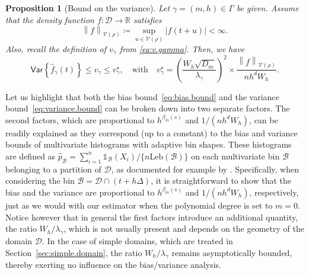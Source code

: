 \documentclass[bj,authoryear]{imsart}
\numberwithin{equation}{section}
\theoremstyle{plain}
\newtheorem{proposition}[theorem]{Proposition}
\theoremstyle{remark}
\newcommand{\R}{\mathbb{R}}
\newcommand{\Var}{\mathsf{Var}}
\newcommand{\1}{\mathds{1}}
\newcommand{\domain}{\mathcal{D}}
\newcommand{\voisin}{\mathcal{V}}
\newcommand{\finfty}{\left\|f\right\|_{\voisin(\rho)}}
\begin{document}
    \begin{proposition}[Bound on the variance]\label{prop:control.stochastic.term}
        Let $\gamma=(m,h)\in \Gamma$ be given.
        Assume that the density function $f:\domain\to\R$ satisfies
        \begin{equation}\label{eq:f.bounded}
            \finfty \coloneqq \sup_{u\in \voisin(\rho)} \lvert f(t+u) \rvert <\infty.
        \end{equation}
        Also, recall the definition of $v_{\gamma}$ from \eqref{eq:v.gamma}. Then, we have
        \begin{equation}\label{eq:variance.bound}
            \Var\left\{\hat{f}_{\gamma}(t)\right\}
            \leq v_{\gamma}
            \leq v_{\gamma}^{\star},
            \quad \text{with} \quad
            v_{\gamma}^{\star} = \left(\frac{W_h\sqrt{D_m}}{\lambda_{\gamma}}\right)^2 \times \frac{\finfty}{n h^d W_h}.
        \end{equation}
    \end{proposition}

    Let us highlight that both the bias bound~\eqref{eq:bias.bound} and the variance bound~\eqref{eq:variance.bound} can be broken down into two separate factors. The second factors, which are proportional to $h^{\beta_m(s)}$ and $1 / (n h^d W_h)$, can be readily explained as they correspond (up to a constant) to the bias and variance bounds of multivariate histograms with adaptive bin shapes. These histograms are defined as $\hat{p}_{\mathcal{B}} = \sum_{i=1}^n \1_{\mathcal{B}}(X_i)/\{n\mathrm{Leb}(\mathcal{B})\}$ on each multivariate bin $\mathcal{B}$ belonging to a partition of $\domain$, as documented for example by \cite{Klemala2009}. Specifically, when considering the bin $\mathcal{B} = \domain\cap(t+h\Delta)$, it is straightforward to show that the bias and the variance are proportional to $h^{\beta_m(s)}$ and $1 / (n h^d W_h)$, respectively, just as we would with our estimator when the polynomial degree is set to $m=0$. Notice however that in general the first factors introduce an additional quantity, the ratio $W_h / \lambda_{\gamma}$, which is not usually present and depends on the geometry of the domain $\domain$. In the case of simple domains, which are treated in Section~\ref{sec:simple.domain}, the ratio $W_h / \lambda_{\gamma}$ remains asymptotically bounded, thereby exerting no influence on the bias/variance analysis.
\end{document}
